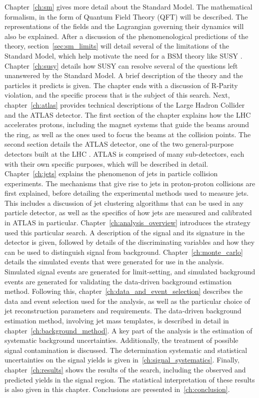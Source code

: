 Chapter~\ref{ch:sm} gives more detail about the Standard Model.
The mathematical formalism, in the form of Quantum Field Theory (QFT) will be described.
The representations of the fields and the Lagrangian governing their dynamics will also be explained.
After a discussion of the phenomenological predictions of the theory, section~\ref{sec:sm_limits} will detail several of the limitations of the Standard Model, which help motivate the need for a BSM theory like SUSY .
Chapter~\ref{ch:susy} details how SUSY can resolve several of the questions left unanswered by the Standard Model.
A brief description of the theory and the particles it predicts is given.
The chapter ends with a discussion of R-Parity violation, and the specific process that is the subject of this search.
Next, chapter~\ref{ch:atlas} provides technical descriptions of the Large Hadron Collider and the ATLAS detector.
The first section of the chapter explains how the LHC accelerates protons, including the magnet systems that guide the beams around the ring, as well as the ones used to focus the beams at the collision points.
The second section details the ATLAS detector, one of the two general-purpose detectors built at the LHC .
ATLAS is comprised of many sub-detectors, each with their own specific purposes, which will be described in detail.
Chapter~\ref{ch:jets} explains the phenomenon of jets in particle collision experiments.
The mechanisms that give rise to jets in proton-proton collisions are first explained, before detailing the experimental methods used to measure jets.
This includes a discussion of jet clustering algorithms that can be used in any particle detector, as well as the specifics of how jets are measured and calibrated in ATLAS in particular.
Chapter~\ref{ch:analysis_overview} introduces the strategy used this particular search.
A description of the signal and its signature in the detector is given, followed by details of the discriminating variables and how they can be used to distinguish signal from background.
Chapter~\ref{ch:monte_carlo} details the simulated events that were generated for use in the analysis.
Simulated signal events are generated for limit-setting, and simulated background events are generated for validating the data-driven background estimation method.
Following this, chapter~\ref{ch:data_and_event_selection} describes the data and event selection used for the analysis, as well as the particular choice of jet reconstruction parameters and requirements.
The data-driven background estimation method, involving jet mass templates, is described in detail in chapter~\ref{ch:background_method}.
A key part of the analysis is the estimation of systematic background uncertainties.
Additionally, the treatment of possible signal contamination is discussed.
The determination systematic and statistical uncertainties on the signal yields is given in~\ref{ch:signal_systematics}.
Finally, chapter~\ref{ch:results} shows the results of the search, including the observed and predicted yields in the signal region.
The statistical interpretation of these results is also given in this chapter.
Conclusions are presented in~\ref{ch:conclusion}.
